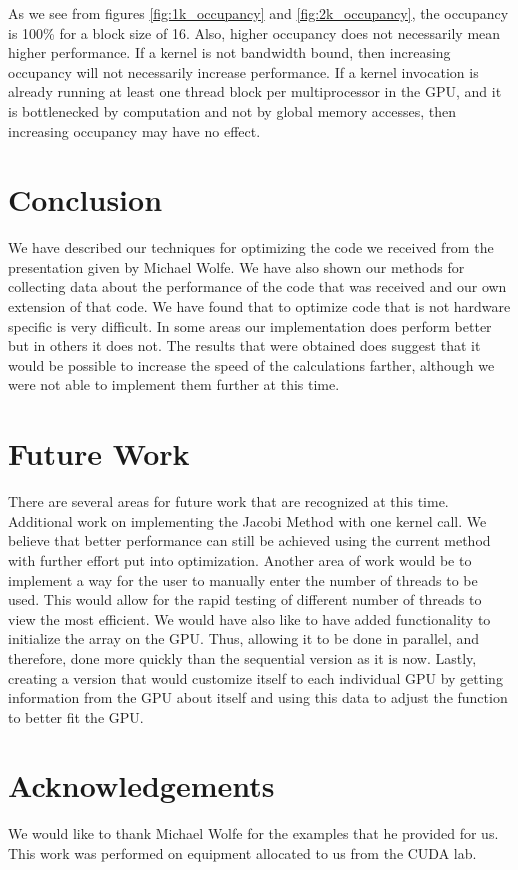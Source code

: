 \documentclass[10pt]{article}
\begin{document}
\begin{multicols}{2}
  As we see from figures \ref{fig:1k_occupancy} and \ref{fig:2k_occupancy}, the occupancy is 100\% for a block size of 16.
  Also, higher occupancy does not necessarily mean higher performance.
  If a kernel is not bandwidth bound, then increasing occupancy will not necessarily increase performance.
  If a kernel invocation is already running at least one thread block per multiprocessor in the GPU, and it is bottlenecked by computation and not by global memory accesses, then increasing occupancy may have no effect. 

  \section{Conclusion} %
  We have described our techniques for optimizing the code we received from the presentation given by Michael Wolfe.
  We have also shown our methods for collecting data about the performance of the code that was received and our own extension of that code.
  We have found that to optimize code that is not hardware specific is very difficult.
  In some areas our implementation does perform better but in others it does not.
  The results that were obtained does suggest that it would be possible to increase the speed of the calculations farther, although we were not able to implement them further at this time.

  \section{Future Work} %
  There are several areas for future work that are recognized at this time.
  Additional work on implementing the Jacobi Method with one kernel call.
  We believe that better performance can still be achieved using the current method with further effort put into optimization.
  Another area of work would be to implement a way for the user to manually enter the number of threads to be used.
  This would allow for the rapid testing of different number of threads to view the most efficient.
  We would have also like to have added functionality to initialize the array on the GPU.
  Thus, allowing it to be done in parallel, and therefore, done more quickly than the sequential version as it is now.
  Lastly, creating a version that would customize itself to each individual GPU by getting information from the GPU about itself and using this data to adjust the function to better fit the GPU.

  \section{Acknowledgements} %
  We would like to thank Michael Wolfe for the examples that he provided for us.
  This work was performed on equipment allocated to us from the CUDA lab.

\end{multicols}
\end{document}
